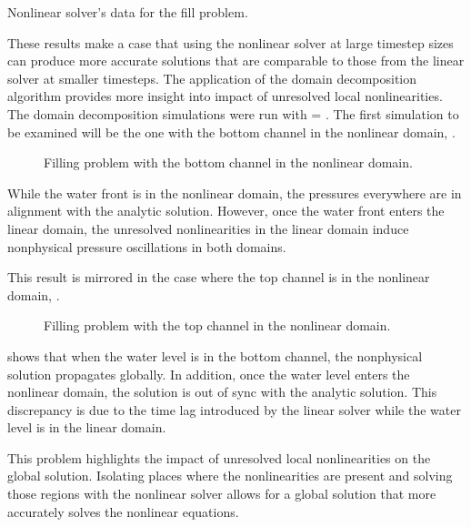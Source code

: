 \begin{table}[ht]
\centering
\singlespace

\caption{Nonlinear solver's data for the fill problem.}
\label{tab:vmpNlnRunTime}
\end{table}

These results make a case that using the nonlinear solver at large timestep sizes can produce more accurate solutions that are comparable to those from the linear solver at smaller timesteps.
The application of the domain decomposition algorithm provides more insight into impact of unresolved local nonlinearities.
The domain decomposition simulations were run with \dtmax{} = .
The first simulation to be examined will be the one with the bottom channel in the nonlinear domain, .

\begin{figure}[h!t]
\centering

\caption{Filling problem with the bottom channel in the nonlinear domain.}
\label{fig:vmpDDBotChan}
\end{figure}

While the water front is in the nonlinear domain, the pressures everywhere are in alignment with the analytic solution.
However, once the water front enters the linear domain, the unresolved nonlinearities in the linear domain induce nonphysical pressure oscillations in both domains.

This result is mirrored in the case where the top channel is in the nonlinear domain, .

\begin{figure}[h!t]
\centering

\caption{Filling problem with the top channel in the nonlinear domain.}
\label{fig:vmpDDTopChan}
\end{figure}

 shows that when the water level is in the bottom channel, the nonphysical solution propagates globally.
In addition, once the water level enters the nonlinear domain, the solution is out of sync with the analytic solution.
This discrepancy is due to the time lag introduced by the linear solver while the water level is in the linear domain.

This problem highlights the impact of unresolved local nonlinearities on the global solution.
Isolating places where the nonlinearities are present and solving those regions with the nonlinear solver allows for a global solution that more accurately solves the nonlinear equations.

